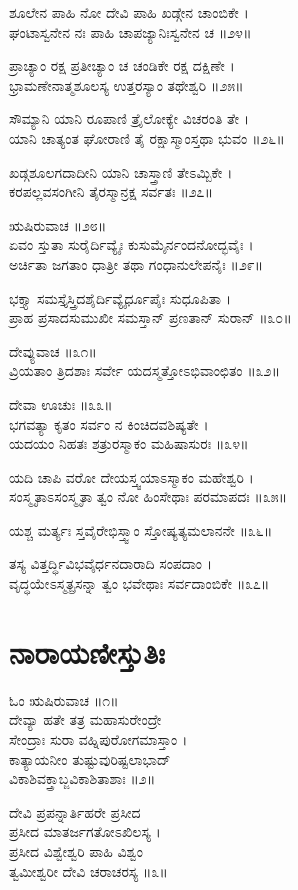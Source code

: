 ಶೂಲೇನ ಪಾಹಿ ನೋ ದೇವಿ ಪಾಹಿ ಖಡ್ಗೇನ ಚಾಂಬಿಕೇ ।\\
ಘಂಟಾಸ್ವನೇನ ನಃ ಪಾಹಿ ಚಾಪಜ್ಯಾನಿಃಸ್ವನೇನ ಚ ॥೨೪॥

ಪ್ರಾಚ್ಯಾಂ ರಕ್ಷ ಪ್ರತೀಚ್ಯಾಂ ಚ ಚಂಡಿಕೇ ರಕ್ಷ ದಕ್ಷಿಣೇ ।\\
ಭ್ರಾಮಣೇನಾತ್ಮಶೂಲಸ್ಯ ಉತ್ತರಸ್ಯಾಂ ತಥೇಶ್ವರಿ ॥೨೫॥

ಸೌಮ್ಯಾನಿ ಯಾನಿ ರೂಪಾಣಿ ತ್ರೈಲೋಕ್ಯೇ ವಿಚರಂತಿ ತೇ ।\\
ಯಾನಿ ಚಾತ್ಯಂತ ಘೋರಾಣಿ ತೈ ರಕ್ಷಾಸ್ಮಾಂಸ್ತಥಾ ಭುವಂ ॥೨೬॥

ಖಡ್ಗಶೂಲಗದಾದೀನಿ ಯಾನಿ ಚಾಸ್ತ್ರಾಣಿ ತೇಽಮ್ಬಿಕೇ ।\\
ಕರಪಲ್ಲವಸಂಗೀನಿ ತೈರಸ್ಮಾನ್ರಕ್ಷ ಸರ್ವತಃ ॥೨೭॥

 ಋಷಿರುವಾಚ ॥೨೮॥\\
ಏವಂ ಸ್ತುತಾ ಸುರೈರ್ದಿವ್ಯೈಃ ಕುಸುಮೈರ್ನಂದನೋದ್ಭವೈಃ ।\\
ಅರ್ಚಿತಾ ಜಗತಾಂ ಧಾತ್ರೀ ತಥಾ ಗಂಧಾನುಲೇಪನೈಃ ॥೨೯॥

ಭಕ್ತ್ಯಾ ಸಮಸ್ತೈಸ್ತ್ರಿದಶೈರ್ದಿವ್ಯೈರ್ಧೂಪೈಃ ಸುಧೂಪಿತಾ ।\\
ಪ್ರಾಹ ಪ್ರಸಾದಸುಮುಖೀ ಸಮಸ್ತಾನ್ ಪ್ರಣತಾನ್ ಸುರಾನ್ ॥೩೦॥

ದೇವ್ಯುವಾಚ ॥೩೧॥\\
ವ್ರಿಯತಾಂ ತ್ರಿದಶಾಃ ಸರ್ವೇ ಯದಸ್ಮತ್ತೋಽಭಿವಾಂಛಿತಂ ॥೩೨॥

ದೇವಾ ಊಚುಃ ॥೩೩॥\\
ಭಗವತ್ಯಾ ಕೃತಂ ಸರ್ವಂ ನ ಕಿಂಚಿದವಶಿಷ್ಯತೇ ।\\
ಯದಯಂ ನಿಹತಃ ಶತ್ರುರಸ್ಮಾಕಂ ಮಹಿಷಾಸುರಃ ॥೩೪॥

ಯದಿ ಚಾಪಿ ವರೋ ದೇಯಸ್ತ್ವಯಾಽಸ್ಮಾಕಂ ಮಹೇಶ್ವರಿ ।\\
ಸಂಸ್ಮೃತಾಽಸಂಸ್ಮೃತಾ ತ್ವಂ ನೋ ಹಿಂಸೇಥಾಃ ಪರಮಾಪದಃ ॥೩೫॥

ಯಶ್ಚ ಮರ್ತ್ಯಃ ಸ್ತವೈರೇಭಿಸ್ತ್ವಾಂ ಸ್ತೋಷ್ಯತ್ಯಮಲಾನನೇ ॥೩೬॥

ತಸ್ಯ ವಿತ್ತರ್ದ್ಧಿವಿಭವೈರ್ಧನದಾರಾದಿ ಸಂಪದಾಂ ।\\
ವೃದ್ಧಯೇಽಸ್ಮತ್ಪ್ರಸನ್ನಾ ತ್ವಂ ಭವೇಥಾಃ ಸರ್ವದಾಂಬಿಕೇ ॥೩೭॥


\section{ನಾರಾಯಣೀಸ್ತುತಿಃ}
ಓಂ ಋಷಿರುವಾಚ ॥೧॥\\
ದೇವ್ಯಾ ಹತೇ ತತ್ರ ಮಹಾಸುರೇಂದ್ರೇ\\
        ಸೇಂದ್ರಾಃ ಸುರಾ ವಹ್ನಿಪುರೋಗಮಾಸ್ತಾಂ ।\\
ಕಾತ್ಯಾಯನೀಂ ತುಷ್ಟುವುರಿಷ್ಟಲಾಭಾದ್\\
      ವಿಕಾಶಿವಕ್ತ್ರಾಬ್ಜವಿಕಾಶಿತಾಶಾಃ ॥೨॥

ದೇವಿ ಪ್ರಪನ್ನಾರ್ತಿಹರೇ ಪ್ರಸೀದ\\
        ಪ್ರಸೀದ ಮಾತರ್ಜಗತೋಽಖಿಲಸ್ಯ ।\\
ಪ್ರಸೀದ ವಿಶ್ವೇಶ್ವರಿ ಪಾಹಿ ವಿಶ್ವಂ\\
        ತ್ವಮೀಶ್ವರೀ ದೇವಿ ಚರಾಚರಸ್ಯ ॥೩॥

